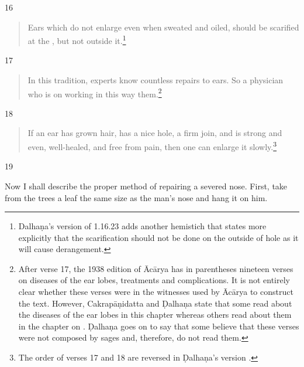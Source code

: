 \begin{translation}
    \item[16]
        \begin{verse}
    Ears which do not enlarge even when sweated and oiled, 
    should be scarified
    at the , but not outside it.\footnote{Dalhaṇa's version of 
    1.16.23 adds another hemistich that states more explicitly that the scarification should not 
    be done on the outside of hole as it will cause derangement.}  
        \end{verse}
    
    \item[17]
          \begin{verse}
    In this tradition, experts know countless repairs to ears.  So a 
    physician who is  on working in this way 
     them.\footnote{After verse 17, the 1938 edition of Ācārya \citep[80]{vulgate} has in parentheses nineteen verses on diseases of the ear lobes, treatments and complications. It is not entirely clear whether these verses were in the witnesses used by Ācārya to construct the text. However, Cakrapāṇidatta \citep[132]{acar-1939} and Ḍalhaṇa \citep[80]{vulgate} state that some read about the diseases of the ear lobes in this chapter whereas others read about them in the chapter on .  Ḍalhaṇa goes on to say that some believe that these verses were not composed by sages and, therefore, do not read them.}
        \end{verse}
    
    \item[18]
           \begin{verse}
    If an ear has grown hair, has a nice hole, a firm join, and is strong and
    even, well-healed, and free from pain, then one can enlarge it slowly.\footnote{The order of verses 17 and 18 are reversed in Ḍalhaṇa's version \citep[80]{vulgate}.}
        \end{verse}
    
    \item[19]
    
    Now I shall describe the proper method of repairing a severed nose.
    First, take from the trees a leaf the same size as the man's nose and hang it
    on him. 
    

\end{translation}
